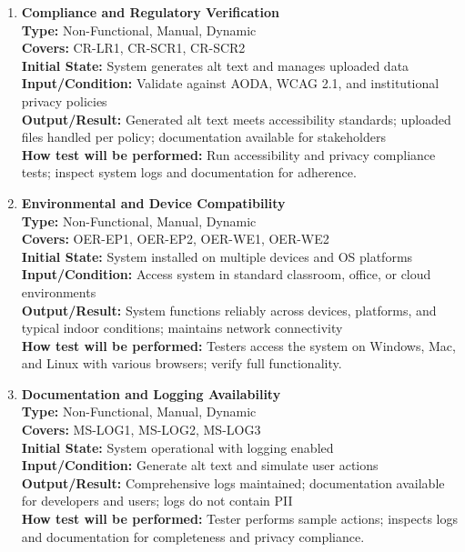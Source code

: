 \documentclass[12pt, titlepage]{article}
\begin{document}
\begin{enumerate}[label=NFR-ST \arabic*., wide=0pt, leftmargin=*]
  \item \textbf{Compliance and Regulatory Verification} \\[2mm]
    \textbf{Type:} Non-Functional, Manual, Dynamic \\
    \textbf{Covers:} CR-LR1, CR-SCR1, CR-SCR2 \\
    \textbf{Initial State:} System generates alt text and manages
    uploaded data \\
    \textbf{Input/Condition:} Validate against AODA, WCAG 2.1, and
    institutional privacy policies \\
    \textbf{Output/Result:} Generated alt text meets accessibility
    standards; uploaded files handled per policy; documentation
    available for stakeholders \\[2mm]
    \textbf{How test will be performed:} Run accessibility and
    privacy compliance tests; inspect system logs and documentation
    for adherence.

  \item \textbf{Environmental and Device Compatibility} \\[2mm]
    \textbf{Type:} Non-Functional, Manual, Dynamic \\
    \textbf{Covers:} OER-EP1, OER-EP2, OER-WE1, OER-WE2 \\
    \textbf{Initial State:} System installed on multiple devices and
    OS platforms \\
    \textbf{Input/Condition:} Access system in standard classroom,
    office, or cloud environments \\
    \textbf{Output/Result:} System functions reliably across devices,
    platforms, and typical indoor conditions; maintains network
    connectivity \\[2mm]
    \textbf{How test will be performed:} Testers access the system on
    Windows, Mac, and Linux with various browsers; verify full functionality.

  \item \textbf{Documentation and Logging Availability} \\[2mm]
    \textbf{Type:} Non-Functional, Manual, Dynamic \\
    \textbf{Covers:} MS-LOG1, MS-LOG2, MS-LOG3 \\
    \textbf{Initial State:} System operational with logging enabled \\
    \textbf{Input/Condition:} Generate alt text and simulate user actions \\
    \textbf{Output/Result:} Comprehensive logs maintained;
    documentation available for developers and users; logs do not
    contain PII \\[2mm]
    \textbf{How test will be performed:} Tester performs sample
    actions; inspects logs and documentation for completeness and
    privacy compliance.


\end{enumerate}
\end{document}
